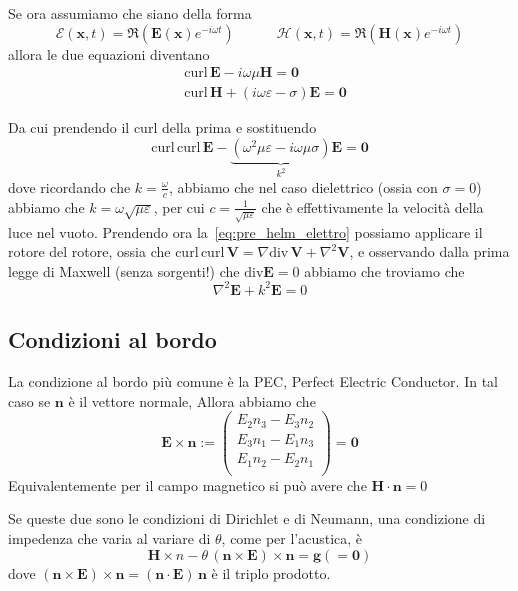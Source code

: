 Se ora assumiamo che siano della forma
\[
  \mathcal{E}{(\mathbf{x} , t)} = \Re {\left( \mathbf{E} {(\mathbf{x} )}
  e^{-i\omega t} \right)}  \quad\quad\quad \mathcal{H}{(\mathbf{x} , t)} = \Re {\left(
\mathbf{H} {(\mathbf{x} )} e^{-i \omega t}\right)} 
\]
allora le due equazioni diventano
\begin{align*}
  &\mathrm{curl}\, \mathbf{E} - i \omega \mu \mathbf{H}  = \mathbf{0} \\
  &\mathrm{curl}\, \mathbf{H} + {(i \omega \varepsilon - \sigma)} \mathbf{E}  =
  \mathbf{0} 
\end{align*}

Da cui prendendo il \(\mathrm{curl}\) della prima e sostituendo
\begin{equation}\label{eq:pre_helm_elettro}
    \mathrm{curl}\,\mathrm{curl}\, \mathbf{E} - \underbrace{\left( \omega^2 \mu
            \varepsilon - i \omega \mu \sigma
    \right)}_{k^2} \mathbf{E} = \mathbf{0} 
\end{equation}
dove ricordando che \(k = \frac{\omega}{c}\), abbiamo che nel caso dielettrico
(ossia con \(\sigma=0\)) abbiamo che \(k = \omega \sqrt{\mu \varepsilon}\), per
cui \(c = \frac{1}{\sqrt{\mu\varepsilon}}\) che è effettivamente la velocità
della luce nel vuoto. Prendendo ora la~\eqref{eq:pre_helm_elettro} possiamo
applicare il rotore del rotore, ossia che \(\mathrm{curl}\, \mathrm{curl} \,
\mathbf{V} = \nabla \mathrm{div}\,\mathbf{V} + \nabla ^2\mathbf{V} \), e
osservando dalla prima legge di Maxwell (senza sorgenti!) che \(\mathrm{div}
\mathbf{E} = 0\) abbiamo che troviamo che
\begin{equation}\label{eq:helmholtz_elettrom}
  \nabla ^2 \mathbf{E} + k^2 \mathbf{E}  = 0
\end{equation}

\subsection{Condizioni al bordo}
La condizione al bordo più comune è la PEC, Perfect Electric Conductor. In tal
caso se \(\mathbf{n} \) è il vettore normale, Allora abbiamo che
\[
  \mathbf{E} \times \mathbf{n} := \begin{pmatrix}
      E _{2}n _{3} -E_{3}n_2 \\
      E _{3}n_1 -E_1 n_3 \\
      E _{1}n_2 -E_2 n_1 \\
  \end{pmatrix} = \mathbf{0} 
\]
Equivalentemente per il campo magnetico si può avere che \(\mathbf{H} \cdot
\mathbf{n} =0\) 

Se queste due sono le condizioni di Dirichlet e di Neumann, una condizione di
impedenza che varia al variare di \(\theta\), come per l'acustica, è 
\[
  \mathbf{H} \times n - \theta \,{(\mathbf{n} \times \mathbf{E} )} \times
  \mathbf{n} = \mathbf{g} (= \mathbf{0})
\]
dove \({(\mathbf{n} \times \mathbf{E} )} \times \mathbf{n} = {(\mathbf{n} \cdot
\mathbf{E} )}\,\mathbf{n} \) è il triplo prodotto.


